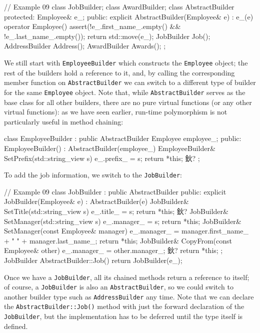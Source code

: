 \begin{code}
// Example 09
class JobBuilder;
class AwardBuilder;
class AbstractBuilder {
  protected:
  Employee& e_;
  public:
  explicit AbstractBuilder(Employee& e) : e_(e) {}
  operator Employee() {
    assert(!e_.first_name_.empty() &&
           !e_.last_name_.empty());
      return std::move(e_);
  }
  JobBuilder Job();
  AddressBuilder Address();
  AwardBuilder Awards();
};
\end{code}

We still start with \texttt{EmployeeBuilder} which constructs the \texttt{Employee} object; the rest of the builders hold a reference to it, and, by calling the corresponding member function on \texttt{AbstractBuilder} we can switch to a different type of builder for the same \texttt{Employee} object. Note that, while \texttt{AbstractBuilder} serves as the base class for all other builders, there are no pure virtual functions (or any other virtual functions): as we have seen earlier, run-time polymorphism is not particularly useful in method chaining:

\begin{code}
class EmployeeBuilder : public AbstractBuilder {
  Employee employee_;
  public:
  EmployeeBuilder() : AbstractBuilder(employee_) {}
  EmployeeBuilder& SetPrefix(std::string_view s){
    e_.prefix_ = s; return *this;
  }
  鈥?
};
\end{code}

To add the job information, we switch to the \texttt{JobBuilder}:

\begin{code}
// Example 09
class JobBuilder : public AbstractBuilder {
  public:
  explicit JobBuilder(Employee& e) : AbstractBuilder(e) {}
  JobBuilder& SetTitle(std::string_view s) {
    e_.title_ = s; return *this;
  }
  鈥?
  JobBuilder& SetManager(std::string_view s) {
    e_.manager_ = s; return *this;
  }
  JobBuilder& SetManager(const Employee& manager) {
    e_.manager_ = manager.first_name_ + " " +
                  manager.last_name_;
     return *this;
  }
  JobBuilder& CopyFrom(const Employee& other) {
    e_.manager_ = other.manager_;
    鈥?
    return *this;
  }
};
JobBuilder AbstractBuilder::Job() {
  return JobBuilder(e_);
}
\end{code}

Once we have a \texttt{JobBuilder}, all its chained methods return a reference to itself; of course, a \texttt{JobBuilder} is also an \texttt{AbstractBuilder}, so we could switch to another builder type such as \texttt{AddressBuilder} any time. Note that we can declare the \texttt{AbstractBuilder::Job()} method with just the forward declaration of the \texttt{JobBuilder}, but the implementation has to be deferred until the type itself is defined.

